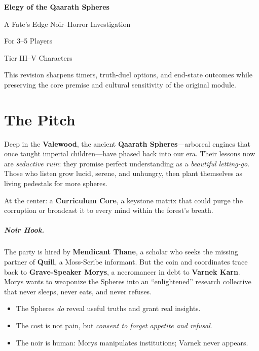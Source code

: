 \documentclass[11pt,twoside]{book}
\begin{document}
\frontmatter
\begin{titlepage}
\centering
\vspace*{2cm}
{\Huge\bfseries Elegy of the Qaarath Spheres\par}
\vspace{0.6cm}
{\Large A Fate's Edge Noir--Horror Investigation\par}
\vspace{1.6cm}
{\Large For 3--5 Players\par}
\vspace{0.3cm}
{\large Tier III--V Characters\par}
\vfill
{\small This revision sharpens timers, truth-duel options, and end-state outcomes while preserving the core premise and cultural sensitivity of the original module.\par}
\end{titlepage}

\tableofcontents
\newpage

\mainmatter

\chapter{The Pitch}
Deep in the \textbf{Valewood}, the ancient \textbf{Qaarath Spheres}---arboreal engines that once taught imperial children---have phased back into our era. Their lessons now are \emph{seductive ruin}: they promise perfect understanding as a \emph{beautiful letting-go}. Those who listen grow lucid, serene, and unhungry, then plant themselves as living pedestals for more spheres.

At the center: a \textbf{Curriculum Core}, a keystone matrix that could purge the corruption or broadcast it to every mind within the forest's breath.

\paragraph{Noir Hook.} The party is hired by \textbf{Mendicant Thane}, a scholar who seeks the missing partner of \textbf{Quill}, a Moss-Scribe informant. But the coin and coordinates trace back to \textbf{Grave-Speaker Morys}, a necromancer in debt to \textbf{Varnek Karn}. Morys wants to weaponize the Spheres into an ``enlightened'' research collective that never sleeps, never eats, and never refuses.

\begin{adventurebox}[frametitle=Truths at the Table]
\begin{itemize}[leftmargin=*]
  \item The Spheres \emph{do} reveal useful truths and grant real insights.
  \item The cost is not pain, but \emph{consent to forget appetite and refusal}.
  \item The noir is human: Morys manipulates institutions; Varnek never appears.
\end{itemize}
\end{adventurebox}
\end{document}
